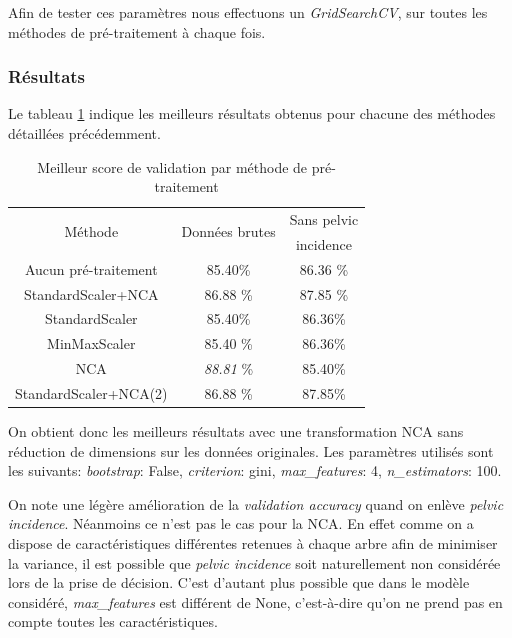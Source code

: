 \documentclass[twocolumn,10pt]{article}
\begin{document}
Afin de tester ces paramètres nous effectuons un \textit{GridSearchCV}, sur toutes les méthodes de pré-traitement à chaque fois.

\subsubsection{Résultats}

Le tableau \ref{tab:accuracy_RF} indique les meilleurs résultats obtenus pour chacune des méthodes détaillées précédemment. 
\begin{table}[htbp]
    \begin{center}
        \caption{\label{tab:accuracy_RF}Meilleur score de validation par méthode de pré-traitement}
        \begin{tabular}{c|cc}
            \multirow{2}{*}{Méthode} & \multirow{2}{*}{Données brutes} & Sans pelvic \\
                                     &                                 & incidence \\
            \hline
            Aucun pré-traitement & 85.40\% & 86.36 \%  \\
            StandardScaler+NCA & 86.88 \% &  87.85 \%\\
            StandardScaler & 85.40\% & 86.36\% \\
            MinMaxScaler & 85.40 \% & 86.36\% \\
            NCA & \textit{88.81} \% & 85.40\% \\
            StandardScaler+NCA(2) & 86.88 \% & 87.85\% \\
        \end{tabular}
    \end{center}
\end{table}

On obtient donc les meilleurs résultats avec une transformation NCA sans réduction de dimensions sur les données originales. Les paramètres utilisés sont les suivants: \textit{bootstrap}: False, \textit{criterion}: gini, \textit{max\_features}: 4, \textit{n\_estimators}: 100.

On note une légère amélioration de la \textit{validation accuracy} quand on enlève  \textit{pelvic incidence}.
Néanmoins ce n'est pas le cas pour la NCA. En effet comme on a dispose de caractéristiques différentes retenues à chaque arbre afin de minimiser la variance, il est possible que \textit{pelvic incidence} soit naturellement non considérée lors de la prise de décision.
C'est d'autant plus possible que dans le modèle considéré, \textit{max\_features} est différent de None, c'est-à-dire qu'on ne prend pas en compte toutes les caractéristiques.
\end{document}
